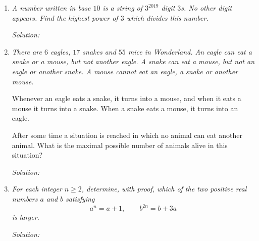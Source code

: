 \documentclass{article}
\begin{document}
\begin{enumerate}[1.]
\item %
{\itshape
A number written in base $10$ is a string of $3^{2019}$ digit $3$s.
No other digit appears.
Find the highest power of $3$ which divides this number.}

\textit{Solution:}


\item %
{\itshape
There are $6$ eagles, $17$ snakes and $55$ mice in Wonderland.
An eagle can eat a snake or a mouse, but not another eagle.
A snake can eat a mouse, but not an eagle or another snake.
A mouse cannot eat an eagle, a snake or another mouse.

Whenever an eagle eats a snake, it turns into a mouse, and when it eats a mouse it turns into a snake. When a snake eats a mouse, it turns into an eagle.

After some time a situation is reached in which no animal can eat another animal.
What is the maximal possible number of animals alive in this situation?}

\textit{Solution:}


\item %
{\itshape
For each integer $n \geq 2$, determine, with proof, which of the two positive real numbers $a$ and $b$ satisfying
\[ a^n = a+1, \qquad b^{2n} = b+3a \]
is larger.}

\textit{Solution:}


\end{enumerate}
\end{document}
